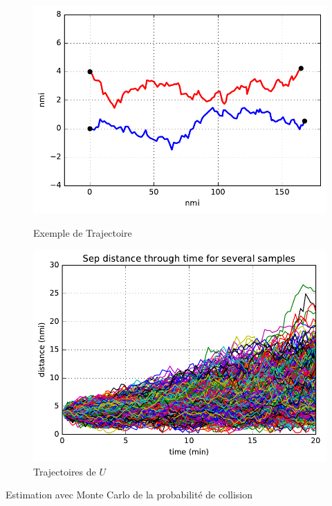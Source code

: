 \documentclass[a4paper, 12pt,twoside]{article}
\numberwithin{equation}{subsection}
\newlength{\mylength}
\begin{document}
	\begin{figure}[htbp]
		\centering
		\begin{minipage}[b]{\mylength}
			\includegraphics[width=\textwidth]{Images/Script_5_1}
			\caption{Exemple de Trajectoire}
			\label{fig:trajtype}
		\end{minipage}
		\hfill
		\begin{minipage}[b]{\mylength}
			\includegraphics[width=\textwidth]{Images/Script_5_5}
			\caption{Trajectoires de $U$}
			\label{fig:trajdiff}
		\end{minipage}
	\end{figure}
	
	\begin{table}[htbp]
		\begin{center}
		\end{center}
		\caption{Estimation avec Monte Carlo de la probabilité de collision}
		\label{tab:MC}
	\end{table}
	
\end{document}
